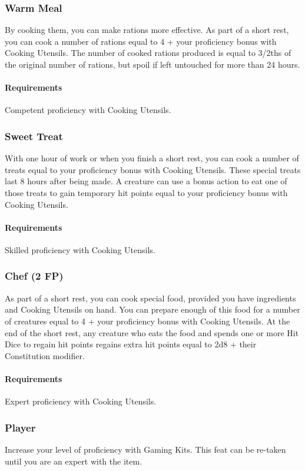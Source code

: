 \subsubsection{Warm Meal} \label{feat::warmmeal}
    By cooking them, you can make rations more effective.
    As part of a short rest, you can cook a number of rations equal to 4 + your proficiency bonus with Cooking Utensils.
    The number of cooked rations produced is equal to 3/2ths of the original number of rations, but spoil if left untouched for more than 24 hours.
    \paragraph{Requirements} Competent proficiency with Cooking Utensils.
\subsubsection{Sweet Treat} \label{feat::sweettreat}
    With one hour of work or when you finish a short rest, you can cook a number of treats equal to your proficiency bonus with Cooking Utensils.
    These special treats last 8 hours after being made.
    A creature can use a bonus action to eat one of those treats to gain temporary hit points equal to your proficiency bonus with Cooking Utensils.
    \paragraph{Requirements} Skilled proficiency with Cooking Utensils.
\subsubsection{Chef (2 FP)} \label{feat::chef}
    As part of a short rest, you can cook special food, provided you have ingredients and Cooking Utensils on hand.
    You can prepare enough of this food for a number of creatures equal to 4 + your proficiency bonus with Cooking Utensils.
    At the end of the short rest, any creature who eats the food and spends one or more Hit Dice to regain hit points regains extra hit points equal to 2d8 + their Constitution modifier.
    \paragraph{Requirements} Expert proficiency with Cooking Utensils.
\subsubsection{Player} \label{feat::player}
    Increase your level of proficiency with Gaming Kits.
    This feat can be re-taken until you are an expert with the item.

